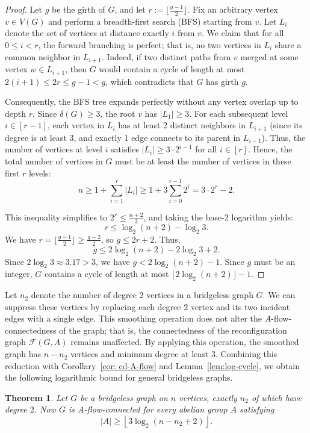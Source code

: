 \documentclass[a4paper,12pt]{article}
\theoremstyle{plain}
\newtheorem{theorem}{Theorem}[section]
\theoremstyle{definition}
\renewcommand\le\leqslant
\renewcommand\ge\geqslant
\begin{document}
\begin{proof}
Let $g$ be the girth of $G$, and let $r:= \lfloor \frac{g-1}{2} \rfloor$. Fix an arbitrary vertex $v \in V(G)$ and perform a breadth-first search (BFS) starting from $v$. 
Let $L_i$ denote the set of vertices at distance exactly $i$ from $v$. We claim that for all $0 \le i < r$, the forward branching is perfect; that is, no two vertices in $L_i$ share a common neighbor in $L_{i+1}$. Indeed, if two distinct paths from $v$ merged at some vertex $w \in L_{i+1}$, then $G$ would contain a cycle of length at most $2(i+1) \le 2r \le g-1 < g$, which contradicts that $G$ has girth $g$. 

Consequently, the BFS tree expands perfectly without any vertex overlap up to depth $r$. Since $\delta(G) \ge 3$, the root $v$ has $|L_1| \ge 3$. For each subsequent level $i\in[r-1]$, each vertex in $L_i$ has at least 2 distinct neighbors in $L_{i+1}$ (since its degree is at least 3, and exactly 1 edge connects to its parent in $L_{i-1}$). 
Thus, the number of vertices at level $i$ satisfies $|L_i| \ge 3 \cdot 2^{i-1}$ for all $i\in[r]$. Hence, the total number of vertices in $G$ must be at least the number of vertices in these first $r$ levels:
\[ n \ge 1 + \sum_{i=1}^{r} |L_i| \ge 1 + 3 \sum_{i=0}^{r-1} 2^i = 3 \cdot 2^r - 2. \]

This inequality simplifies to $2^r \le \frac{n+2}{3}$, and taking the base-2 logarithm yields:
\[ r \le \log_2(n+2) - \log_2 3. \]
We have
$r = \lfloor \frac{g-1}{2} \rfloor \ge \frac{g-2}{2}$, 
so
$g \le 2r + 2$. 
Thus,
\[ g \le 2\log_2(n+2) - 2\log_2 3 + 2. \]
Since $2\log_2 3 \approx 3.17 > 3$, 
we have $g < 2\log_2(n+2) - 1$. Since $g$ must be an integer, $G$ contains a cycle of length at most $\lfloor2\log_2(n+2)\rfloor-1$.
\end{proof}

Let $n_2$ denote the number of degree $2$ vertices in a bridgeless graph $G$. We can  suppress these vertices by replacing each degree $2$ vertex and its two incident edges with a single edge. This smoothing operation does not alter the $A$-flow-connectedness of the graph; that is, the connectedness of the reconfiguration graph $\mathcal{F}(G,A)$ remains unaffected. 
By applying this operation, the smoothed graph has $n-n_2$ vertices and minimum degree at least $3$. Combining this reduction with 
Corollary~\ref{cor: cd-A-flow} and
Lemma~\ref{lem:log-cycle},
we obtain the following logarithmic bound for general bridgeless graphs.

\begin{theorem}\label{thm:bridgeless-log-bound}
    Let $G$ be a bridgeless graph on $n$ vertices, exactly $n_2$ of which have degree $2$. Now $G$ is $A$-flow-connected for every abelian group $A$ satisfying
    \[ |A| \ge \left\lfloor 3\log_2(n-n_2+2) \right\rfloor. \]
\end{theorem}
\end{document}
